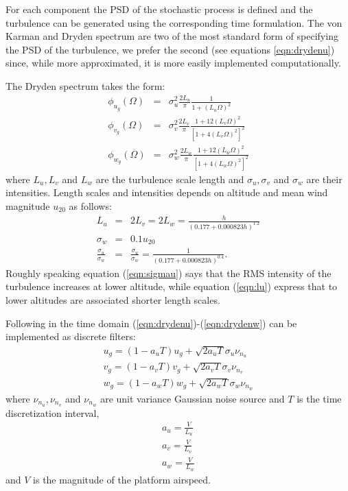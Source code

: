 \documentclass[a4paper,11pt]{report}
\begin{document}
For each component the PSD of the stochastic process is defined and the turbulence can be generated using the corresponding time formulation.
The von Karman and Dryden spectrum are two of the most standard form of specifying the PSD of the turbulence, we prefer the second (see equations \ref{eqn:drydenu}) since, while more approximated, it is more easily implemented computationally.

The Dryden spectrum takes the form:
\begin{eqnarray}
\phi_{u_g}(\Omega) & = & \sigma^2_u \frac{2L_u}{\pi} \frac{1}{1+(L_u\Omega)^2}\label{eqn:drydenu}\\ 
\phi_{v_g}(\Omega) & = & \sigma^2_v \frac{2L_v}{\pi} \frac{1+12(L_v\Omega)^2}{\left[1+4(L_v\Omega)^2\right]^2}\\ 
\phi_{w_g}(\Omega) & = & \sigma^2_w \frac{2L_w}{\pi} \frac{1+12(L_w\Omega)^2}{\left[1+4(L_w\Omega)^2\right]^2}\label{eqn:drydenw}
\end{eqnarray}
where $L_u,L_v$ and $L_w$ are the turbulence scale length and $\sigma_u,\sigma_v$ and $\sigma_w$ are their intensities.
Length scales and intensities depends on altitude and mean wind magnitude $u_{20}$ as follows:
\begin{eqnarray}
L_u &=& 2L_v = 2L_w = \frac{h}{(0.177+0.000823 h)^{1.2}}\label{eqn:lu}\\
\sigma_w&=&0.1u_{20} \\
\frac{\sigma_u}{\sigma_w}&=&\frac{\sigma_u}{\sigma_w}=\frac{1}{(0.177+0.000823 h)^{0.4}}\label{eqn:sigmau}.
\end{eqnarray}
Roughly speaking equation (\ref{eqn:sigmau}) says that the RMS intensity of the turbulence increases at lower altitude, while equation (\ref{eqn:lu}) express that to lower altitudes are associated shorter length scales.

Following \cite{milf8785c} in the time domain (\ref{eqn:drydenu})-(\ref{eqn:drydenw}) can be implemented as discrete filters:  
\begin{eqnarray}
u_g=(1-a_uT)u_g+\sqrt{2a_uT}\sigma_u\nu_{n_u}\\
v_g=(1-a_vT)v_g+\sqrt{2a_vT}\sigma_v\nu_{n_v}\\
w_g=(1-a_wT)w_g+\sqrt{2a_wT}\sigma_w\nu_{n_w}
\end{eqnarray}
where $\nu_{n_u},\nu_{n_v}$ and $\nu_{n_w}$ are unit variance Gaussian noise source and $T$ is the time discretization interval,  
\begin{eqnarray}
a_u=\frac{V}{L_u}\\ 
a_v=\frac{V}{L_v}\\ 
a_w=\frac{V}{L_w}
\end{eqnarray}
and $V$ is the magnitude of the platform airspeed.
\end{document}
